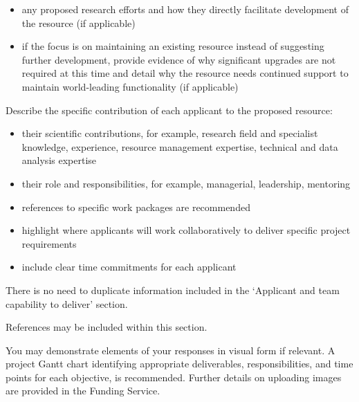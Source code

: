 \documentclass[11pt]{article}
\newenvironment{instruction}{%
    \begin{tcolorbox}[breakable,colback=red!5,colframe=red,title=Instruction]%
	}{%
    	\end{tcolorbox}%
	}
\begin{document}
\begin{instruction}
\begin{itemize}
	\item any proposed research efforts and how they directly facilitate
	development of the resource (if applicable)

	\item if the focus is on maintaining an existing resource instead of
	suggesting further development, provide evidence of why significant
	upgrades are not required at this time and detail why the resource needs
	continued support to maintain world-leading functionality (if applicable)

\end{itemize}

Describe the specific contribution of each applicant to the proposed resource:

\begin{itemize}

	\item their scientific contributions, for example, research field and
	specialist knowledge, experience, resource management expertise, technical
	and data analysis expertise

	\item their role and responsibilities, for example, managerial, leadership,
	mentoring

	\item references to specific work packages are recommended

	\item highlight where applicants will work collaboratively to deliver
	specific project requirements

	\item include clear time commitments for each applicant

\end{itemize}

There is no need to duplicate information included in the ‘Applicant and team
capability to deliver’ section.

References may be included within this section.

You may demonstrate elements of your responses in visual form if relevant. A
project Gantt chart identifying appropriate deliverables, responsibilities, and
time points for each objective, is recommended. Further details on uploading
images are provided in the Funding Service.

\end{instruction}

% 
\end{document}

